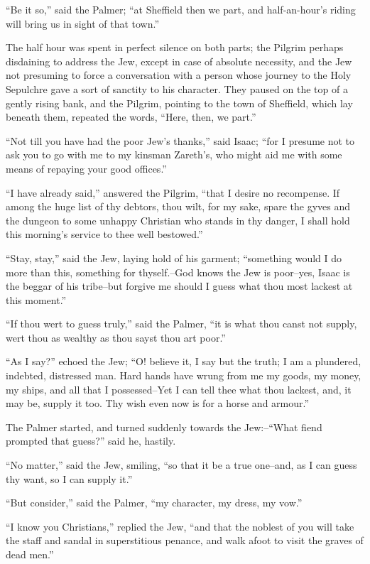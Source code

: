 ``Be it so,'' said the Palmer; ``at Sheffield then we part, and
half-an-hour's riding will bring us in sight of that town.''

The half hour was spent in perfect silence on both parts; the Pilgrim
perhaps disdaining to address the Jew, except in case of absolute
necessity, and the Jew not presuming to force a conversation with a
person whose journey to the Holy Sepulchre gave a sort of sanctity to
his character. They paused on the top of a gently rising bank, and the
Pilgrim, pointing to the town of Sheffield, which lay beneath them,
repeated the words, ``Here, then, we part.''

``Not till you have had the poor Jew's thanks,'' said Isaac; ``for I
presume not to ask you to go with me to my kinsman Zareth's, who might
aid me with some means of repaying your good offices.''

``I have already said,'' answered the Pilgrim, ``that I desire no
recompense. If among the huge list of thy debtors, thou wilt, for my
sake, spare the gyves and the dungeon to some unhappy Christian who
stands in thy danger, I shall hold this morning's service to thee well
bestowed.''

``Stay, stay,'' said the Jew, laying hold of his garment; ``something
would I do more than this, something for thyself.--God knows the Jew is
poor--yes, Isaac is the beggar of his tribe--but forgive me should I
guess what thou most lackest at this moment.''

``If thou wert to guess truly,'' said the Palmer, ``it is what thou
canst not supply, wert thou as wealthy as thou sayst thou art poor.''

``As I say?'' echoed the Jew; ``O! believe it, I say but the truth; I am
a plundered, indebted, distressed man. Hard hands have wrung from me my
goods, my money, my ships, and all that I possessed--Yet I can tell thee
what thou lackest, and, it may be, supply it too. Thy wish even now is
for a horse and armour.''

The Palmer started, and turned suddenly towards the Jew:--``What fiend
prompted that guess?'' said he, hastily.

``No matter,'' said the Jew, smiling, ``so that it be a true one--and,
as I can guess thy want, so I can supply it.''

``But consider,'' said the Palmer, ``my character, my dress, my vow.''

``I know you Christians,'' replied the Jew, ``and that the noblest of
you will take the staff and sandal in superstitious penance, and walk
afoot to visit the graves of dead men.''


